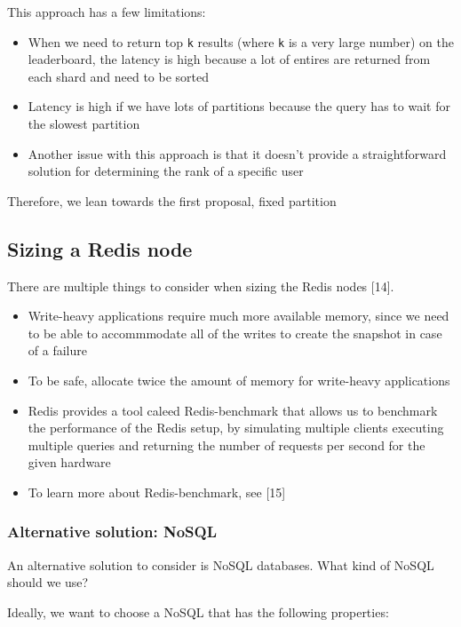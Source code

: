 \documentclass{report}
\theoremstyle{definition}
\let\oldsubsection\subsection
\let\oldsubsubsection\subsubsection
\renewcommand{\subsection}{\oldsubsection*}
\renewcommand{\subsubsection}{\oldsubsubsection*}
\begin{document}
This approach has a few limitations:

\begin{itemize}
\item
When we need to return top \lstinline|k| results (where \lstinline|k| is a very large number) on the leaderboard, the latency is high because a lot of entires are returned from each shard and need to be sorted
\item
Latency is high if we have lots of partitions because the query has to wait for the slowest partition
\item
Another issue with this approach is that it doesn't provide a straightforward solution for determining the rank of a specific user
\end{itemize}

Therefore, we lean towards the first proposal, fixed partition

\subsection{Sizing a Redis node}

There are multiple things to consider when sizing the Redis nodes [14].

\begin{itemize}
\item
Write-heavy applications require much more available memory, since we need to be able to accommmodate all of the writes to create the snapshot in case of a failure
\item
To be safe, allocate twice the amount of memory for write-heavy applications
\item
Redis provides a tool caleed Redis-benchmark that allows us to benchmark the performance of the Redis setup, by simulating multiple clients executing multiple queries and returning the number of requests per second for the given hardware
\item
To learn more about Redis-benchmark, see [15]
\end{itemize}

\subsubsection{Alternative solution: NoSQL}

An alternative solution to consider is NoSQL databases. What kind of NoSQL should we use?

Ideally, we want to choose a NoSQL that has the following properties:
\end{document}

